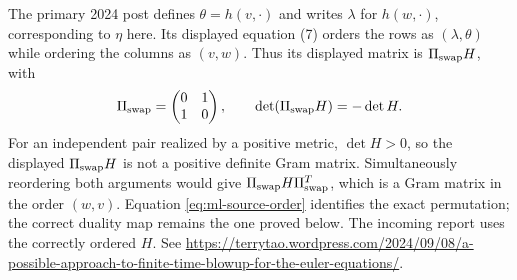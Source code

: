 The primary 2024 post defines $\theta=h(v,\cdot)$ and writes $\lambda$ for
$h(w,\cdot)$, corresponding to $\eta$ here. Its displayed equation (7)
orders the rows as $(\lambda,\theta)$ while ordering the columns as $(v,w)$.
Thus its displayed matrix is $\Pi_{\rm swap}H$, with
\begin{equation}\label{eq:ml-source-order}
 \Pi_{\rm swap}=\begin{pmatrix}0&1\\1&0\end{pmatrix},\qquad
 \det(\Pi_{\rm swap}H)=-\det H.
\end{equation}
For an independent pair realized by a positive metric, $\det H>0$, so
the displayed $\Pi_{\rm swap}H$ is not a positive definite Gram matrix. Simultaneously
reordering both arguments would give $\Pi_{\rm swap}H\Pi_{\rm swap}^T$, which is a Gram matrix in
the order $(w,v)$. Equation \eqref{eq:ml-source-order} identifies the exact
permutation; the correct duality map remains the one proved below.
The incoming report uses the correctly ordered $H$.
See \url{https://terrytao.wordpress.com/2024/09/08/a-possible-approach-to-finite-time-blowup-for-the-euler-equations/}.

